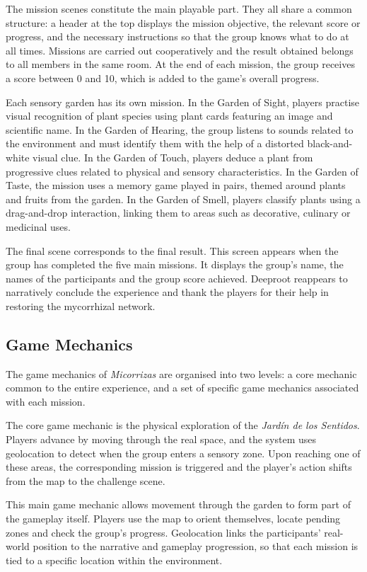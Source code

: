 The mission scenes constitute the main playable part. They all share a common structure: a header at the top displays the mission objective, the relevant score or progress, and the necessary instructions so that the group knows what to do at all times. Missions are carried out cooperatively and the result obtained belongs to all members in the same room. At the end of each mission, the group receives a score between 0 and 10, which is added to the game’s overall progress.

Each sensory garden has its own mission. In the Garden of Sight, players practise visual recognition of plant species using plant cards featuring an image and scientific name. In the Garden of Hearing, the group listens to sounds related to the environment and must identify them with the help of a distorted black-and-white visual clue. In the Garden of Touch, players deduce a plant from progressive clues related to physical and sensory characteristics. In the Garden of Taste, the mission uses a memory game played in pairs, themed around plants and fruits from the garden. In the Garden of Smell, players classify plants using a drag-and-drop interaction, linking them to areas such as decorative, culinary or medicinal uses.

The final scene corresponds to the final result. This screen appears when the group has completed the five main missions. It displays the group’s name, the names of the participants and the group score achieved. Deeproot reappears to narratively conclude the experience and thank the players for their help in restoring the mycorrhizal network.


\subsection{Game Mechanics}
\label{sec:mechanics}
The game mechanics of \textit{Micorrizas} are organised into two levels: a core mechanic common to the entire experience, and a set of specific game mechanics associated with each mission. 

The core game mechanic is the physical exploration of the \textit{Jardín de los Sentidos}. Players advance by moving through the real space, and the system uses geolocation to detect when the group enters a sensory zone. Upon reaching one of these areas, the corresponding mission is triggered and the player’s action shifts from the map to the challenge scene.

This main game mechanic allows movement through the garden to form part of the gameplay itself. Players use the map to orient themselves, locate pending zones and check the group’s progress. Geolocation links the participants’ real-world position to the narrative and gameplay progression, so that each mission is tied to a specific location within the environment.

